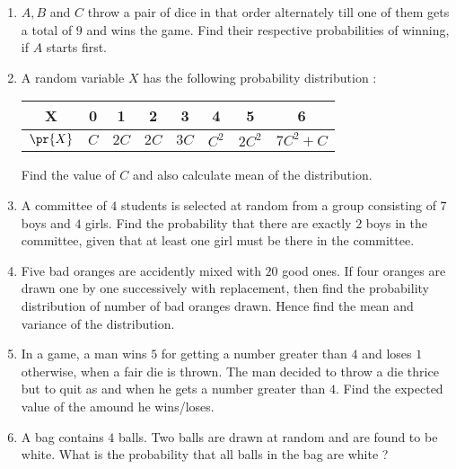 \begin{enumerate}
    \item $A, B$ and $C$ throw a pair of dice in that order alternately till one of them gets a total of $9$ and wins the game. Find their respective probabilities of winning, if $A$ starts first.
    \item A random variable $X$ has the following probability distribution :
          \begin{table}[h!]
              \begin{center}
                  \begin{tabular}{|c |c| c | c | c | c | c | c |}
                      \hline
                      X        & 0   & 1    & 2    & 3    & 4     & 5      & 6         \\
                      \hline
                      $\pr{X}$ & $C$ & $2C$ & $2C$ & $3C$ & $C^2$ & $2C^2$ & $7C^2 +C$ \\
                      \hline
                  \end{tabular}
              \end{center}
          \end{table}
          Find the value of $C$ and also calculate mean of the distribution.
    \item A committee of $4$ students is selected at random from a group consisting of $7$ boys and $4$ girls. Find the probability that there are exactly $2$ boys in the committee, given that at least one girl must be there in the committee.
    \item Five bad oranges are accidently mixed with $20$ good ones. If four oranges are drawn one by one successively with replacement, then find the probability distribution of number of bad oranges drawn. Hence find the mean and variance of the distribution.
    \item In a game, a man wins \rupee $5$ for getting a number greater than $4$ and loses \rupee $1$ otherwise, when a fair die is thrown. The man decided to throw a die thrice but to quit as and when he gets a number greater than $4$. Find the expected value of the amound he wins/loses.
    \item A bag contains $4$ balls. Two balls are drawn at random  and are found to be white. What is the probability that all balls in the bag are white ?
\end{enumerate}